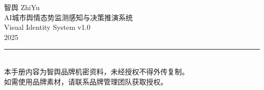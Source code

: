 \begin{center}
\begin{tcolorbox}[
  enhanced,
  colback=CyberCyan!5,
  colframe=CyberCyan,
  boxrule=1pt,
  arc=1pt,
  width=0.85\textwidth,
  halign=center
]
{\heiti\sihao\color{CyberCyanDark} 智舆 ZhiYu}\\[4pt]
{\songti\wuhao\color{SlateGray} AI城市舆情态势监测感知与决策推演系统}\\[8pt]
{\songti\wuhao\color{SlateGray} Visual Identity System v1.0}\\[2pt]
{\songti\wuhao\color{SlateGray} 2025}\\[8pt]
\textcolor{MidGray}{\rule{6cm}{0.3pt}}\\[4pt]
{\songti\tiny\color{TextSecondary} 本手册内容为智舆品牌机密资料，未经授权不得外传复制。}\\
{\songti\tiny\color{TextSecondary} 如需使用品牌素材，请联系品牌管理团队获取授权。}
\end{tcolorbox}
\end{center}
